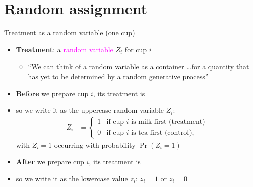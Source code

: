 \documentclass[table, xcolor = {dvipsnames}, 9pt]{beamer}
\theoremstyle{plain}
\newcommand{\mh}[1]{{\color{magenta}{#1}}}
\begin{document}
\section{Random assignment}
\begin{frame}[t]{Treatment as a random variable (one cup)}
\vfill
\begin{itemize} \vfill
\item \textbf{Treatment}: a \textcolor{magenta}{random variable} $Z_i$ for cup $i$ \vfill
\begin{itemize} \vfill
\item ``We can think of a random variable as a container \ldots for a quantity that has yet to be determined by a random generative process'' \citep[][p.~16]{aronowmiller2019} \vfill
\end{itemize} \vfill
\item \textbf{Before} we prepare cup $i$, its treatment is \mh{unsettled} \vfill
\item[] so we write it as the uppercase random variable $Z_i$:
\begin{align*}
Z_i & =
\begin{cases}
1 & \text{if cup } i \text{ is milk-first (treatment)} \\
0 & \text{if cup } i \text{ is tea-first (control),}
\end{cases}
\end{align*}
with $Z_i = 1$ occurring with probability $\Pr\left(Z_i = 1\right)$ \vfill
\item \textbf{After} we prepare cup $i$, its treatment is \mh{settled} \vfill
\item[] so we write it as the lowercase value $z_i$: $z_i = 1$ or $z_i = 0$ \vfill
\end{itemize}
\vfill
\end{frame}
\end{document}
